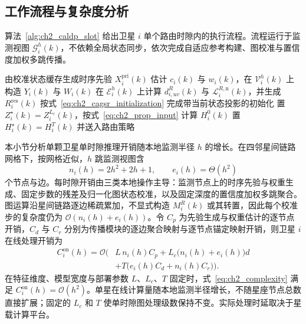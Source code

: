 \subsection{工作流程与复杂度分析}
\label{subsec:ch2_complexity}

算法~\ref{alg:ch2_caldp_slot} 给出卫星 $i$ 单个路由时隙内的执行流程。流程运行于监测视图 $\mathcal G_i^h(k)$，不依赖全局状态同步，依次完成自适应参考构建、图校准与置信度加权多跳传播。

\begin{algorithm}[!htp]
\caption{卫星 $i$ 处 CA-LDP 的单时隙推理}
\label{alg:ch2_caldp_slot}
由校准状态缓存生成时序先验 $X_i^{\mathrm{pri}}(k)$\;
估计 $c_i(k)$ 与 $w_i(k)$，在 $\mathcal V_i^h(k)$ 上构造 $Y_i(k)$ 与 $W_i(k)$\;
在 $\mathcal E_i^h(k)$ 上计算 $d_{i,uv}^R(k)$ 与 $\mathcal L_i^{R,\mathrm n}(k)$，并生成 $R_i^{\mathrm{res}}(k)$\;
按式~\eqref{eq:ch2_cagsr_initialization} 完成带当前状态投影的初始化\;
置 $Z_i^\star(k)=Z_i^{L_c}(k)$，按式~\eqref{eq:ch2_prop_input} 计算 $H_i^0(k)$\;
置 $H_i^\star(k)=H_i^T(k)$ 并送入路由策略\;
\end{algorithm}

本小节分析单颗卫星单时隙推理开销随本地监测半径 $h$ 的增长。在四邻星间链路网格下，按网格近似，$h$ 跳监测视图含
\begin{equation}
n_i(h)=2h^2+2h+1,\qquad e_i(h)=\Theta(h^2)
\label{eq:ch2_view_size}
\end{equation}
个节点与边。每时隙开销由三类本地操作主导：监测节点上的时序先验与权重生成、固定步数的残差及归一化图状态校准，以及固定深度的置信度加权多跳聚合。图运算沿星间链路逐边稀疏累加，不显式构造 $M_i^R(k)$ 或其转置，因此每个校准步的复杂度仍为 $\mathcal O(n_i(h)+e_i(h))$。令 $C_p$ 为先验生成与权重估计的逐节点开销，$C_d$ 与 $C_r$ 分别为传播模块的逐边聚合映射与逐节点锚定映射开销，则卫星 $i$ 在线处理开销为
\begin{equation}
\begin{aligned}
C_i^{\mathrm{on}}(h)
=
\mathcal{O}\big(
&L\,n_i(h)C_p
+L_c\big(n_i(h)+e_i(h)\big)d \\
&+T\big(e_i(h)C_d+n_i(h)C_r\big)
\big).
\end{aligned}
\label{eq:ch2_complexity}
\end{equation}
在特征维度、模型宽度与部署参数 $L$、$L_c$、$T$ 固定时，式~\eqref{eq:ch2_complexity} 满足 $C_i^{\mathrm{on}}(h)=\mathcal O(h^2)$。单星在线计算量随本地监测半径增长，不随星座节点总数直接扩展；固定的 $L_c$ 和 $T$ 使单时隙图处理级数保持不变。实际处理时延取决于星载计算平台。


